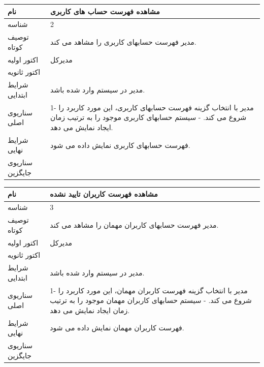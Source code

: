 \documentclass{article}
\begin{document}
\vspace{2cm}


\begin{tabular}{|p{2cm}|p{10cm}|}
\hline
نام
&
مشاهده فهرست حساب های کاربری
\\
\hline
شناسه
&
2
\\
\hline
توصیف کوتاه
&
مدیر فهرست حسابهای کاربری را مشاهد می کند.
\\
\hline
اکتور اولیه
&
مدیرکل
\\
\hline
اکتور ثانویه
&

\\
\hline
شرایط ابتدایی
&
مدیر در سیستم وارد شده باشد.
\\
\hline
سناریوی اصلی
&
1-	مدیر با انتخاب گزینه فهرست حسابهای کاربری، این مورد کاربرد را شروع می کند.
\newline
2-	سیستم حسابهای کاربری موجود را به ترتیب زمان ایجاد نمایش می دهد.
\\
\hline
شرایط نهایی
&
فهرست حسابهای کاربری نمایش داده می شود.
\\
\hline
سناریوی جایگزین
&

\\
\hline
\end{tabular}

\vspace{2cm}


\begin{tabular}{|p{2cm}|p{10cm}|}
\hline
نام
&
مشاهده فهرست کاربران تایید نشده
\\
\hline
شناسه
&
3
\\
\hline
توصیف کوتاه
&
مدیر فهرست حسابهای کاربران مهمان را مشاهد می کند.
\\
\hline
اکتور اولیه
&
مدیرکل
\\
\hline
اکتور ثانویه
&

\\
\hline
شرایط ابتدایی
&
مدیر در سیستم وارد شده باشد.
\\
\hline
سناریوی اصلی
&
1-	مدیر با انتخاب گزینه فهرست کاربران مهمان، این مورد کاربرد را شروع می کند.
\newline
2-	سیستم حسابهای کاربران مهمان موجود را به ترتیب زمان ایجاد نمایش می دهد.
\\
\hline
شرایط نهایی
&
فهرست کاربران مهمان نمایش داده می شود.
\\
\hline
سناریوی جایگزین
&

\\
\hline
\end{tabular}

\vspace{2cm}
\end{document}

